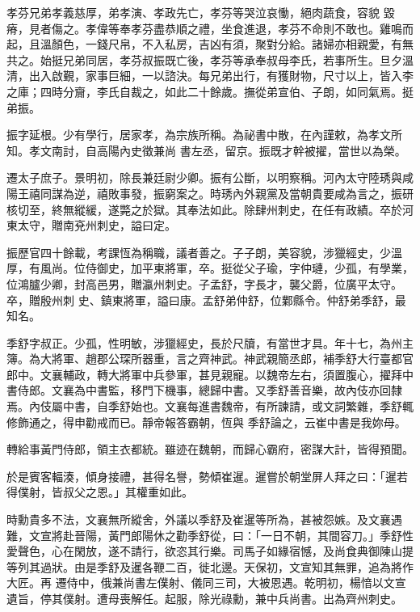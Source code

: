 \begin{pinyinscope}
 孝芬兄弟孝義慈厚，弟孝演、孝政先亡，孝芬等哭泣哀慟，絕肉蔬食，容貌
 毀瘠，見者傷之。孝偉等奉孝芬盡恭順之禮，坐食進退，孝芬不命則不敢也。雞鳴而起，且溫顏色，一錢尺帛，不入私房，吉凶有須，聚對分給。諸婦亦相親愛，有無共之。始挺兄弟同居，孝芬叔振既亡後，孝芬等承奉叔母李氏，若事所生。旦夕溫清，出入啟覲，家事巨細，一以諮決。每兄弟出行，有獲財物，尺寸以上，皆入李之庫；四時分齎，李氏自裁之，如此二十餘歲。撫從弟宣伯、子朗，如同氣焉。挺弟振。



 振字延根。少有學行，居家孝，為宗族所稱。為祕書中散，在內謹敕，為孝文所知。孝文南討，自高陽內史徵兼尚
 書左丞，留京。振既才幹被擢，當世以為榮。



 遷太子庶子。景明初，除長兼廷尉少卿。振有公斷，以明察稱。河內太守陸琇與咸陽王禧同謀為逆，禧敗事發，振窮案之。時琇內外親黨及當朝貴要咸為言之，振研核切至，終無縱緩，遂斃之於獄。其奉法如此。除肆州刺史，在任有政績。卒於河東太守，贈南兗州刺史，謚曰定。



 振歷官四十餘載，考課恆為稱職，議者善之。子子朗，美容貌，涉獵經史，少溫厚，有風尚。位侍御史，加平東將軍，卒。挺從父子瑜，字仲璉，少孤，有學業，位鴻臚少卿，封高邑男，贈瀛州刺史。子孟舒，字長才，襲父爵，位廣平太守。卒，贈殷州刺
 史、鎮東將軍，謚曰康。孟舒弟仲舒，位鄴縣令。仲舒弟季舒，最知名。



 季舒字叔正。少孤，性明敏，涉獵經史，長於尺牘，有當世才具。年十七，為州主簿。為大將軍、趙郡公琛所器重，言之齊神武。神武親簡丞郎，補季舒大行臺都官郎中。文襄輔政，轉大將軍中兵參軍，甚見親寵。以魏帝左右，須置腹心，擢拜中書侍郎。文襄為中書監，移門下機事，總歸中書。又季舒善音樂，故內伎亦回隸焉。內伎屬中書，自季舒始也。文襄每進書魏帝，有所諫請，或文詞繁雜，季舒輒修飾通之，得申勸戒而已。靜帝報答霸朝，恆與
 季舒論之，云崔中書是我妳母。



 轉給事黃門侍郎，領主衣都統。雖迹在魏朝，而歸心霸府，密謀大計，皆得預聞。



 於是賓客輻湊，傾身接禮，甚得名譽，勢傾崔暹。暹嘗於朝堂屏人拜之曰：「暹若得僕射，皆叔父之恩。」其權重如此。



 時勳貴多不法，文襄無所縱舍，外議以季舒及崔暹等所為，甚被怨嫉。及文襄遇難，文宣將赴晉陽，黃門郎陽休之勸季舒從，曰：「一日不朝，其間容刀。」季舒性愛聲色，心在閑放，遂不請行，欲恣其行樂。司馬子如緣宿憾，及尚食典御陳山提等列其過狀。由是季舒及暹各鞭二百，徙北邊。天保初，文宣知其無罪，追為將作大匠。再
 遷侍中，俄兼尚書左僕射、儀同三司，大被恩遇。乾明初，楊愔以文宣遺旨，停其僕射。遭母喪解任。起服，除光祿勳，兼中兵尚書。出為齊州刺史。




\end{pinyinscope}

